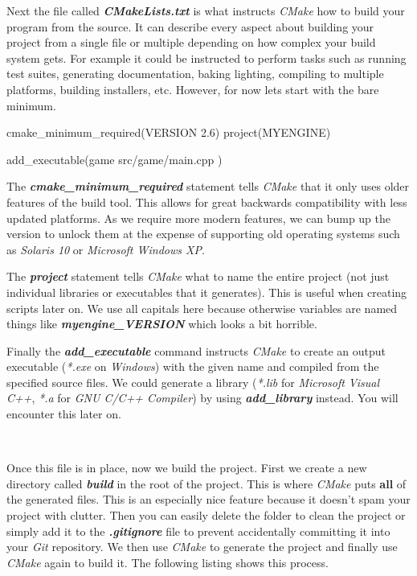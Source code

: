 \documentclass[10pt]{article}
\begin{document}
Next the file called \textbf{\textit{CMakeLists.txt}} is what instructs
\textit{CMake} how to build your program from the source.  It can describe
every aspect about building your project from a single file or multiple
depending on how complex your build system gets. For example it could
be instructed to perform tasks such as running test suites, generating
documentation, baking lighting, compiling to multiple platforms, building
installers, etc. However, for now lets start with the bare minimum.

\begin{Code}
  cmake_minimum_required(VERSION 2.6)
  project(MYENGINE)

  add_executable(game
    src/game/main.cpp
  )
\end{Code}

The \textbf{\textit{cmake\_minimum\_required}} statement tells
\textit{CMake} that it only uses older features of the build tool. This
allows for great backwards compatibility with less updated platforms. As
we require more modern features, we can bump up the version to unlock them
at the expense of supporting old operating systems such as \textit{Solaris
10} or \textit{Microsoft Windows XP}.

The \textbf{\textit{project}} statement tells \textit{CMake} what to
name the entire project (not just individual libraries or executables
that it generates). This is useful when creating scripts later on. We
use all capitals here because otherwise variables are named things like
\textbf{\textit{myengine\_VERSION}} which looks a bit horrible.

Finally the \textbf{\textit{add\_executable}} command instructs
\textit{CMake} to create an output executable (\textit{*.exe}
on \textit{Windows}) with the given name and compiled from the
specified source files. We could generate a library (\textit{*.lib}
for \textit{Microsoft Visual C++}, \textit{*.a} for \textit{GNU C/C++ Compiler})
by using \textbf{\textit{add\_library}} instead. You will encounter this
later on.

\

Once this file is in place, now we build the project. First we create
a new directory called \textbf{\textit{build}} in the root of the
project.  This is where \textit{CMake} puts \textbf{all} of the generated
files. This is an especially nice feature because it doesn't spam
your project with clutter.  Then you can easily delete the folder to
clean the project or simply add it to the \textbf{\textit{.gitignore}}
file to prevent accidentally committing it into your \textit{Git}
repository. We then use \textit{CMake} to generate the project and
finally use \textit{CMake} again to build it. The following listing
shows this process.
\end{document}
